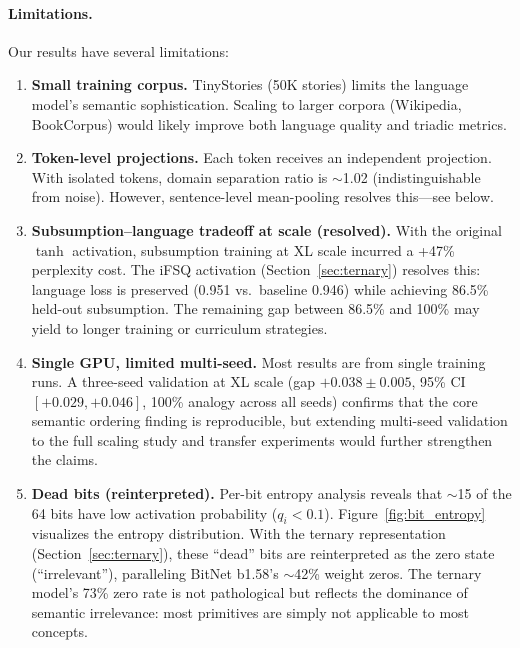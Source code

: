 \documentclass[11pt,a4paper]{article}
\begin{document}
\paragraph{Limitations.}
Our results have several limitations:
\begin{enumerate}
    \item \textbf{Small training corpus.} TinyStories (50K stories) limits the language model's semantic sophistication. Scaling to larger corpora (Wikipedia, BookCorpus) would likely improve both language quality and triadic metrics.
    \item \textbf{Token-level projections.} Each token receives an independent projection. With isolated tokens, domain separation ratio is $\sim$1.02 (indistinguishable from noise). However, sentence-level mean-pooling resolves this---see below.
    \item \textbf{Subsumption--language tradeoff at scale (resolved).} With the original $\tanh$ activation, subsumption training at XL scale incurred a +47\% perplexity cost. The iFSQ activation (Section~\ref{sec:ternary}) resolves this: language loss is preserved (0.951 vs.\ baseline 0.946) while achieving 86.5\% held-out subsumption. The remaining gap between 86.5\% and 100\% may yield to longer training or curriculum strategies.
    \item \textbf{Single GPU, limited multi-seed.} Most results are from single training runs. A three-seed validation at XL scale (gap $+0.038 \pm 0.005$, 95\% CI $[+0.029, +0.046]$, 100\% analogy across all seeds) confirms that the core semantic ordering finding is reproducible, but extending multi-seed validation to the full scaling study and transfer experiments would further strengthen the claims.
    \item \textbf{Dead bits (reinterpreted).} Per-bit entropy analysis reveals that $\sim$15 of the 64 bits have low activation probability ($q_i < 0.1$). Figure~\ref{fig:bit_entropy} visualizes the entropy distribution. With the ternary representation (Section~\ref{sec:ternary}), these ``dead'' bits are reinterpreted as the zero state (``irrelevant''), paralleling BitNet b1.58's $\sim$42\% weight zeros. The ternary model's 73\% zero rate is not pathological but reflects the dominance of semantic irrelevance: most primitives are simply not applicable to most concepts.
\end{enumerate}
\end{document}
